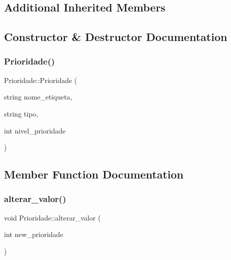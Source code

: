 \subsection*{Additional Inherited Members}


\subsection{Constructor \& Destructor Documentation}
\mbox{\label{classPrioridade_adcad6f20e5c15a659968e088c8dd642e}} 
\subsubsection{\texorpdfstring{Prioridade()}{Prioridade()}}
{\footnotesize\ttfamily Prioridade\+::\+Prioridade (\begin{DoxyParamCaption}\item[{string}]{nome\+\_\+etiqueta,  }\item[{string}]{tipo,  }\item[{int}]{nivel\+\_\+prioridade }\end{DoxyParamCaption})}



\subsection{Member Function Documentation}
\mbox{\label{classPrioridade_ac9f930199df2060972b589c4f40ef3c7}} 
\subsubsection{\texorpdfstring{alterar\+\_\+valor()}{alterar\_valor()}}
{\footnotesize\ttfamily void Prioridade\+::alterar\+\_\+valor (\begin{DoxyParamCaption}\item[{int}]{new\+\_\+prioridade }\end{DoxyParamCaption})}

\mbox{\label{classPrioridade_a8457dcba4fb03aeb7ae5505d5d25226d}} 
